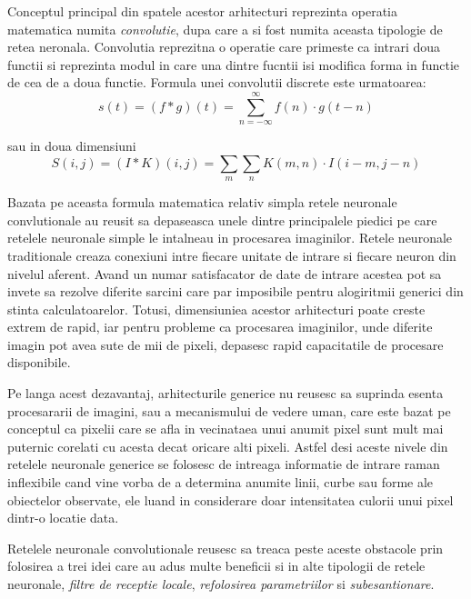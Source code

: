 \documentclass[a4paper,12pt]{book}
\begin{document}
				Conceptul principal din spatele acestor arhitecturi reprezinta operatia matematica numita \textit{convolutie}, dupa care a si fost numita aceasta tipologie de retea neronala. Convolutia reprezitna o operatie care primeste ca intrari doua functii si reprezinta modul in care una dintre fucntii isi modifica forma in functie de cea de a doua functie.
				Formula unei convolutii discrete este urmatoarea:
				\begin{equation*}
					s(t) = (f*g)(t) = \sum_{n=-\infty}^{\infty} f(n) \cdot g(t - n)
				\end{equation*}	\par
				\noindent sau in doua dimensiuni
				\begin{equation}\label{convo}				
					S(i, j) = (I*K)(i, j) = \sum_{m} \sum_{n} K(m, n) \cdot I(i - m, j - n)
				\end{equation}
				
				Bazata pe aceasta formula matematica relativ simpla retele neuronale convlutionale au reusit sa depaseasca unele dintre principalele piedici pe care retelele neuronale simple le intalneau in procesarea imaginilor. Retele neuronale traditionale creaza conexiuni intre fiecare unitate de intrare si fiecare neuron din nivelul aferent. Avand un numar satisfacator de date de intrare acestea pot sa invete sa rezolve diferite sarcini care par imposibile pentru alogiritmii generici din stinta calculatoarelor. Totusi, dimensiuniea acestor arhitecturi poate creste extrem de rapid, iar pentru probleme ca procesarea imaginilor, unde diferite imagin pot avea sute de mii de pixeli, depasesc rapid capacitatile de procesare disponibile. \par
				Pe langa acest dezavantaj, arhitecturile generice nu reusesc sa suprinda esenta procesararii de imagini, sau a mecanismului de vedere uman, care este bazat pe conceptul ca pixelii care se afla in vecinataea unui anumit pixel sunt mult mai puternic corelati cu acesta decat oricare alti pixeli. Astfel desi aceste nivele din retelele neuronale generice se folosesc de intreaga informatie de intrare raman inflexibile cand vine vorba de a determina anumite linii, curbe sau forme ale obiectelor observate, ele luand in considerare doar intensitatea culorii unui pixel dintr-o locatie data. \par
				
				Retelele neuronale convolutionale reusesc sa treaca peste aceste obstacole prin folosirea a trei idei care au adus multe beneficii si in alte tipologii de retele neuronale,\textit{ filtre de receptie locale}, \textit{refolosirea parametriilor} si \textit{subesantionare}. \par
			
\end{document}

